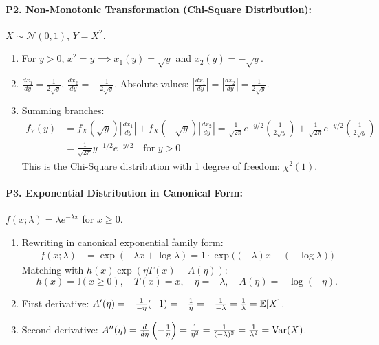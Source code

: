 \paragraph{P2. Non-Monotonic Transformation (Chi-Square Distribution):}
$X \sim \mathcal{N}(0, 1)$, $Y = X^2$.
\begin{enumerate}[label=(\alph*)]
    \item For $y > 0$, $x^2 = y \implies x_1(y) = \sqrt{y}$ and $x_2(y) = -\sqrt{y}$.
    \item $\frac{dx_1}{dy} = \frac{1}{2\sqrt{y}}$, $\frac{dx_2}{dy} = -\frac{1}{2\sqrt{y}}$.
    Absolute values: $\left|\frac{dx_1}{dy}\right| = \left|\frac{dx_2}{dy}\right| = \frac{1}{2\sqrt{y}}$.
    \item Summing branches:
    \begin{align*}
    f_Y(y) &= f_X(\sqrt{y})\left|\frac{dx_1}{dy}\right| + f_X(-\sqrt{y})\left|\frac{dx_2}{dy}\right| = \frac{1}{\sqrt{2\pi}}e^{-y/2} \left(\frac{1}{2\sqrt{y}}\right) + \frac{1}{\sqrt{2\pi}}e^{-y/2} \left(\frac{1}{2\sqrt{y}}\right) \\
    &= \frac{1}{\sqrt{2\pi}} y^{-1/2} e^{-y/2} \quad \text{for } y > 0
    \end{align*}
    This is the Chi-Square distribution with 1 degree of freedom: $\chi^2(1)$.
\end{enumerate}

\paragraph{P3. Exponential Distribution in Canonical Form:}
$f(x; \lambda) = \lambda e^{-\lambda x}$ for $x \ge 0$.
\begin{enumerate}[label=(\alph*)]
    \item Rewriting in canonical exponential family form:
    \begin{align*}
    f(x; \lambda) &= \exp(-\lambda x + \log\lambda) = 1 \cdot \exp\big((-\lambda) x - (-\log\lambda)\big)
    \end{align*}
    Matching with $h(x)\exp(\eta T(x) - A(\eta))$:
    \[
    h(x) = \mathbb{I}(x \ge 0), \quad T(x) = x, \quad \eta = -\lambda, \quad A(\eta) = -\log(-\eta).
    \]
    \item First derivative: $A'(\eta) = -\frac{1}{-\eta}(-1) = -\frac{1}{\eta} = -\frac{1}{-\lambda} = \frac{1}{\lambda} = \operatorname{\mathbb{E}}[X]$.
    \item Second derivative: $A''(\eta) = \frac{d}{d\eta}\left(-\frac{1}{\eta}\right) = \frac{1}{\eta^2} = \frac{1}{(-\lambda)^2} = \frac{1}{\lambda^2} = \operatorname{Var}(X)$.
\end{enumerate}

